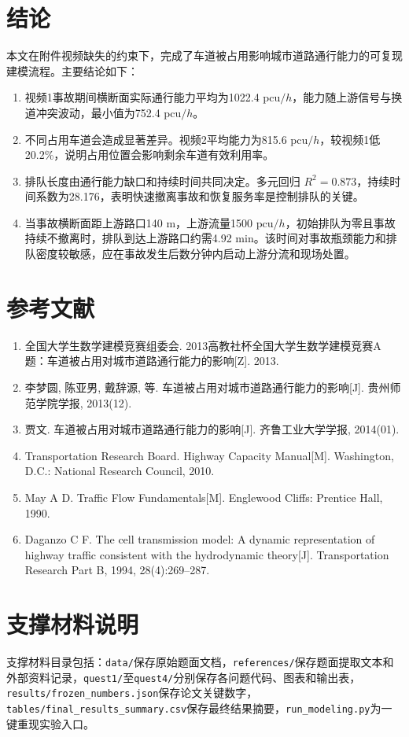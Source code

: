 \documentclass[UTF8,a4paper,12pt]{ctexart}
\newcommand{\pcu}{\mathrm{pcu}}
\begin{document}
\section{结论}
本文在附件视频缺失的约束下，完成了车道被占用影响城市道路通行能力的可复现建模流程。主要结论如下：
\begin{enumerate}
\item 视频1事故期间横断面实际通行能力平均为1022.4 $\pcu/h$，能力随上游信号与换道冲突波动，最小值为752.4 $\pcu/h$。
\item 不同占用车道会造成显著差异。视频2平均能力为815.6 $\pcu/h$，较视频1低20.2\%，说明占用位置会影响剩余车道有效利用率。
\item 排队长度由通行能力缺口和持续时间共同决定。多元回归 $R^2=0.873$，持续时间系数为28.176，表明快速撤离事故和恢复服务率是控制排队的关键。
\item 当事故横断面距上游路口140 m，上游流量1500 $\pcu/h$，初始排队为零且事故持续不撤离时，排队到达上游路口约需4.92 min。该时间对事故瓶颈能力和排队密度较敏感，应在事故发生后数分钟内启动上游分流和现场处置。
\end{enumerate}

\section{参考文献}
\begin{enumerate}
\item 全国大学生数学建模竞赛组委会. 2013高教社杯全国大学生数学建模竞赛A题：车道被占用对城市道路通行能力的影响[Z]. 2013.
\item 李梦圆, 陈亚男, 戴辞源, 等. 车道被占用对城市道路通行能力的影响[J]. 贵州师范学院学报, 2013(12).
\item 贾文. 车道被占用对城市道路通行能力的影响[J]. 齐鲁工业大学学报, 2014(01).
\item Transportation Research Board. Highway Capacity Manual[M]. Washington, D.C.: National Research Council, 2010.
\item May A D. Traffic Flow Fundamentals[M]. Englewood Cliffs: Prentice Hall, 1990.
\item Daganzo C F. The cell transmission model: A dynamic representation of highway traffic consistent with the hydrodynamic theory[J]. Transportation Research Part B, 1994, 28(4):269--287.
\end{enumerate}

\appendix
\section{支撑材料说明}
支撑材料目录包括：\verb|data/|保存原始题面文档，\verb|references/|保存题面提取文本和外部资料记录，\verb|quest1/|至\verb|quest4/|分别保存各问题代码、图表和输出表，\verb|results/frozen_numbers.json|保存论文关键数字，\verb|tables/final_results_summary.csv|保存最终结果摘要，\verb|run_modeling.py|为一键重现实验入口。
\end{document}
